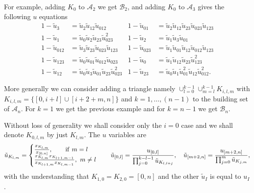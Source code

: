 \documentclass[hidelinks,12pt]{article}
\newcommand{\bea}[1]{\begin{eqnarray}\label{#1} }
\newcommand{\eea}{\end{eqnarray}}
\def\bea{\begin{eqnarray}}
\def\eea{\end{eqnarray}}
\begin{document}
For example, adding $K_0$ to $\mathscr A_2$ we get $\mathscr B_2$, and  adding $K_0$ to $\mathscr A_3$ gives the following $u$ equations
\begin{align*}
1-\tilde u_{3}&=\tilde u_{2} \tilde u_{12} \tilde u_{012}&
1-\tilde u_{01}&=\tilde u_{2} \tilde u_{12} \tilde u_{23} \tilde u_{023} \tilde u_{123}\\
1-\tilde u_{1}&=\tilde u_{0} \tilde u_{2} \tilde u_{23} \tilde u_{023}^2&
1-\tilde u_{2}&=\tilde u_{1} \tilde u_{3} \tilde u_{01}\\
1-\tilde u_{012}&=\tilde u_{3} \tilde u_{23} \tilde u_{023} \tilde u_{123}&
1-\tilde u_{023}&=\tilde u_{1} \tilde u_{01} \tilde u_{12} \tilde u_{012} \tilde u_{123}\\
1-\tilde u_{123}&=\tilde u_{0} \tilde u_{01} \tilde u_{012} \tilde u_{023}&
1-\tilde u_{0}&=\tilde u_{1} \tilde u_{12} \tilde u_{23} \tilde u_{123}^2\\
1-\tilde u_{12}&=\tilde u_{0} \tilde u_{3} \tilde u_{01} \tilde u_{23} \tilde u_{023}^2&
1-\tilde u_{23}&=\tilde u_{0} \tilde u_{1} \tilde u_{01}^2 \tilde u_{12} \tilde u_{012}^2.
\end{align*}

More generally we can consider adding a triangle namely $\cup_{l=0}^{k-1}\cup_{m=l}^{k-1} K_{i,l,m}$ with $K_{i,l,m}=\{[0,i+l]\cup [i+2+m,n] \}$ and $k=1,\dots,(n-1)$ to the building set of $\mathscr{A}_n$.
For $k=1$ we get the previous example and for $k=n-1$ we get ${\mathscr B_n}$.

Without loss of generality we shall consider only the $i=0$ case and we shall denote $K_{0,l,m}$ by just $K_{l,m}$.
The $u$ variables are
\bea
\tilde u_{K_{l,m}}=\begin{cases} \frac{x_{K_{l,m}}}{x_{[0,n]}},~~~~~~ {\rm if} ~m=l \\
\frac{x_{K_{l,m}} x_{K_{l+1,m-1}}}{x_{K_{l+1,m}}x_{K_{l,m-1}}}
,~ m\neq l \end{cases}\quad 
\tilde u_{[0,l]}=\frac{u_{[0,l]}}{\prod_{j=0}^{k-l-1} \tilde u_{K_{l,l+j}}},\quad 
\tilde u_{[m+2,n]}=\frac{u_{[m+2,n]}}{\prod_{j=0}^{m}\tilde u_{K_{j,m}}},
\eea
with the  understanding that $K_{1,0}=K_{2,0}=[0,n]$ and the other $\tilde u_I$ is equal to $u_I$. 
\end{document}
